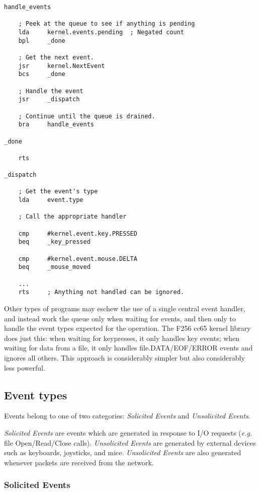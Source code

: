 \begin{verbatim}
handle_events

    ; Peek at the queue to see if anything is pending
    lda		kernel.events.pending  ; Negated count
    bpl		_done

    ; Get the next event.
    jsr		kernel.NextEvent
    bcs		_done

    ; Handle the event
    jsr		_dispatch
            
    ; Continue until the queue is drained.
    bra		handle_events
            
_done

    rts

_dispatch

    ; Get the event's type
    lda		event.type
    					
    ; Call the appropriate handler

    cmp		#kernel.event.key.PRESSED
    beq		_key_pressed

    cmp		#kernel.event.mouse.DELTA
    beq		_mouse_moved
			
    ...
    rts     ; Anything not handled can be ignored.
\end{verbatim}

Other types of programs may eschew the use of a single central event handler, and instead work the queue only when waiting for events, and then only to handle the event types expected for the operation.  The F256 cc65 kernel library does just this: when waiting for keypresses, it only handles key events; when waiting for data from a file, it only handles file.DATA/EOF/ERROR events and ignores all others.  This approach is considerably simpler but also considerably less powerful.

\subsection*{Event types}

Events belong to one of two categories: {\em Solicited Events} and {\em Unsolicited Events}.

{\em Solicited Events} are events which are generated in response to I/O requests ({\it e.g.} file Open/Read/Close calls).  {\em Unsolicited Events} are generated by external devices such as keyboards, joysticks, and mice.  {\em Unsolicited Events} are also generated whenever packets are received from the network.

\subsubsection*{Solicited Events}

